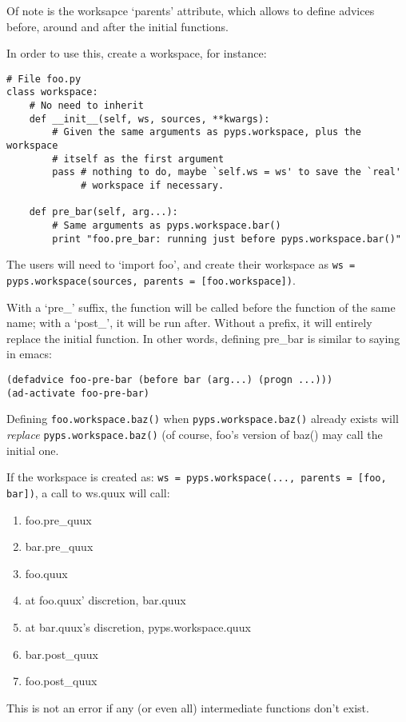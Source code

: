 \documentclass[a4paper]{article}
\begin{document}
Of note is the worksapce `parents' attribute, which allows to define advices
before, around and after the initial functions.

In order to use this, create a workspace, for instance:

\begin{lstlisting}
# File foo.py
class workspace:
	# No need to inherit
	def __init__(self, ws, sources, **kwargs):
		# Given the same arguments as pyps.workspace, plus the workspace
		# itself as the first argument
		pass # nothing to do, maybe `self.ws = ws' to save the `real'
			 # workspace if necessary.

	def pre_bar(self, arg...):
		# Same arguments as pyps.workspace.bar()
		print "foo.pre_bar: running just before pyps.workspace.bar()"
\end{lstlisting}

The users will need to `import foo', and create their workspace as \lstinline|ws = pyps.workspace(sources, parents = [foo.workspace])|.

With a `pre\_' suffix, the function will be called before the function of
the same name; with a `post\_', it will be run after. Without a prefix,
it will entirely replace the initial function. In other words, defining
pre\_bar is similar to saying in emacs:
\begin{lstlisting}
(defadvice foo-pre-bar (before bar (arg...) (progn ...)))
(ad-activate foo-pre-bar)
\end{lstlisting}

Defining \lstinline|foo.workspace.baz()| when \lstinline|pyps.workspace.baz()| already exists
will \emph{replace} \lstinline|pyps.workspace.baz()| (of course, foo's version of baz()
may call the initial one.

If the workspace is created as: \lstinline|ws = pyps.workspace(..., parents = [foo, bar])|, a call to ws.quux will call:

\begin{enumerate}
\item foo.pre\_quux
\item bar.pre\_quux
\item foo.quux
\item at foo.quux' discretion, bar.quux
\item at bar.quux's discretion, pyps.workspace.quux
\item bar.post\_quux
\item foo.post\_quux
\end{enumerate}

This is not an error if any (or even all) intermediate functions don't
exist.
\end{document}
